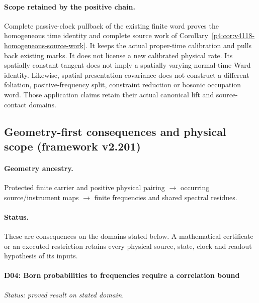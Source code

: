\documentclass[12pt,a4paper]{article}
\begin{document}
\paragraph{Scope retained by the positive chain.}
Complete passive-clock pullback of the existing finite word proves the
homogeneous time identity and complete source work of
Corollary~\ref{p4:cor:v4118-homogeneous-source-work}. It keeps the actual
proper-time calibration and pulls back existing marks. It does not
license a new calibrated physical rate. Its spatially constant tangent
does not imply a spatially varying normal-time Ward identity. Likewise,
spatial presentation covariance does not construct a different foliation,
positive-frequency split, constraint reduction or bosonic occupation
word. Those application claims retain their actual canonical lift and
source-contact domains.





\subsection{Geometry-first consequences and physical scope (framework v2.201)}
\label{p4:sec:v2201-geometry-first-consequences}
\paragraph{Geometry ancestry.}
Protected finite carrier and positive physical pairing $\to$ occurring source/instrument maps $\to$ finite frequencies and shared spectral residues.
\paragraph{Status.}
These are consequences on the domains stated below.
A mathematical certificate or an executed restriction retains every
physical source, state, clock and readout hypothesis of its inputs.



\paragraph{D04: Born probabilities to frequencies require a correlation bound}
\label{p4:sec:v2201-derived-d04}
\noindent\textit{Status: proved result on stated domain.}
\end{document}

